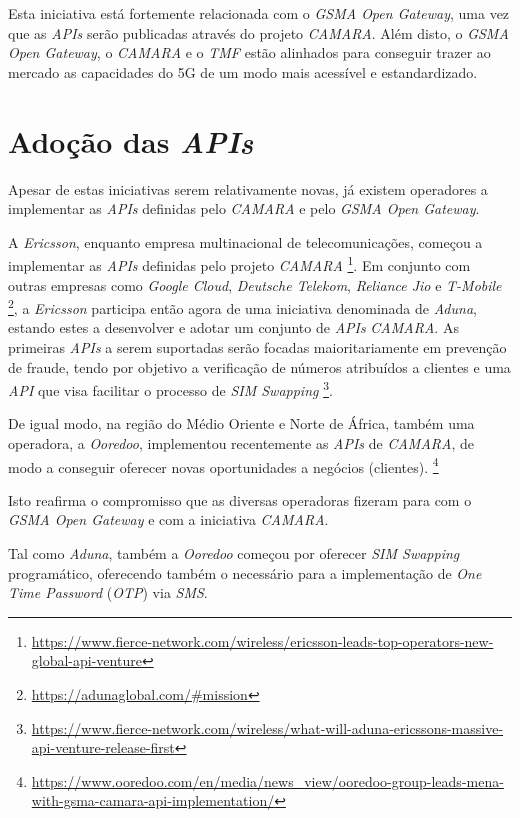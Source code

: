 Esta iniciativa está fortemente relacionada com o \emph{GSMA Open Gateway}, uma
vez que as \emph{APIs} serão publicadas através do projeto
\emph{CAMARA}\cite{5gamericas}. Além disto, o \emph{GSMA Open Gateway}, o
\emph{CAMARA} e o \emph{TMF} estão alinhados para conseguir trazer ao mercado
as capacidades do 5G de um modo mais acessível e estandardizado.


\section{Adoção das \emph{APIs}}

Apesar de estas iniciativas serem relativamente novas, já existem operadores a
implementar as \emph{APIs} definidas pelo \emph{CAMARA} e pelo \emph{GSMA Open
	Gateway}.

A \emph{Ericsson}, enquanto empresa multinacional de telecomunicações, começou
a implementar as \emph{APIs} definidas pelo projeto \emph{CAMARA}
\footnote{\url{https://www.fierce-network.com/wireless/ericsson-leads-top-operators-new-global-api-venture}}.
Em conjunto com outras empresas como \emph{Google Cloud}, \emph{Deutsche
	Telekom}, \emph{Reliance Jio} e \emph{T-Mobile}
\footnote{\url{https://adunaglobal.com/\#mission}}, a \emph{Ericsson} participa
então agora de uma iniciativa denominada de \emph{Aduna}, estando estes a
desenvolver e adotar um conjunto de \emph{APIs} \emph{CAMARA}. As primeiras
\emph{APIs} a serem suportadas serão focadas maioritariamente em prevenção de
fraude, tendo por objetivo a verificação de números atribuídos a clientes e uma
\emph{API} que visa facilitar o processo de \emph{SIM Swapping}
\footnote{\url{https://www.fierce-network.com/wireless/what-will-aduna-ericssons-massive-api-venture-release-first}}.

De igual modo, na região do Médio Oriente e Norte de África, também uma
operadora, a \emph{Ooredoo}, implementou recentemente as \emph{APIs} de
\emph{CAMARA}, de modo a conseguir oferecer novas oportunidades a negócios
(clientes).
\footnote{\url{https://www.ooredoo.com/en/media/news_view/ooredoo-group-leads-mena-with-gsma-camara-api-implementation/}}

Isto reafirma o compromisso que as diversas operadoras fizeram para com o
\emph{GSMA Open Gateway} e com a iniciativa \emph{CAMARA}.

Tal como \emph{Aduna}, também a \emph{Ooredoo} começou por oferecer \emph{SIM
	Swapping} programático, oferecendo também o necessário para a implementação de
\emph{One Time Password} (\emph{OTP}) via \emph{SMS}.

